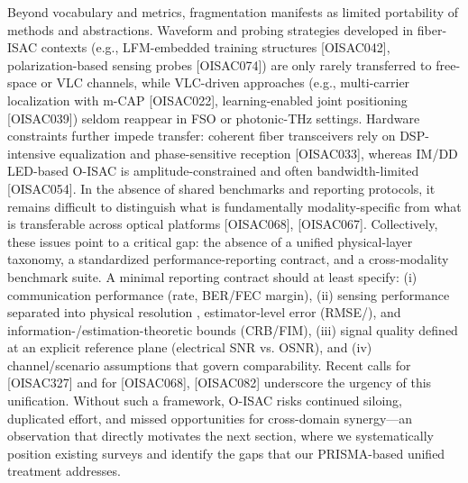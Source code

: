 {} Beyond vocabulary and metrics, fragmentation manifests as limited portability of methods and abstractions. Waveform and probing strategies developed in fiber-ISAC contexts (e.g., LFM-embedded training structures [O\markdownRendererUnderscore{}ISAC\markdownRendererUnderscore{}042], polarization-based sensing probes [O\markdownRendererUnderscore{}ISAC\markdownRendererUnderscore{}074]) are only rarely transferred to free-space or VLC channels, while VLC-driven approaches (e.g., multi-carrier localization with m-CAP [O\markdownRendererUnderscore{}ISAC\markdownRendererUnderscore{}022], learning-enabled joint positioning [O\markdownRendererUnderscore{}ISAC\markdownRendererUnderscore{}039]) seldom reappear in FSO or photonic-THz settings. Hardware constraints further impede transfer: coherent fiber transceivers rely on DSP-intensive equalization and phase-sensitive reception [O\markdownRendererUnderscore{}ISAC\markdownRendererUnderscore{}033], whereas IM/DD LED-based O-ISAC is amplitude-constrained and often bandwidth-limited [O\markdownRendererUnderscore{}ISAC\markdownRendererUnderscore{}054]. In the absence of shared benchmarks and reporting protocols, it remains difficult to distinguish what is fundamentally modality-specific from what is transferable across optical platforms [O\markdownRendererUnderscore{}ISAC\markdownRendererUnderscore{}068], [O\markdownRendererUnderscore{}ISAC\markdownRendererUnderscore{}067].\markdownRendererParagraphSeparator
{} Collectively, these issues point to a critical gap: the absence of a unified physical-layer taxonomy, a standardized performance-reporting contract, and a cross-modality benchmark suite. A minimal reporting contract should at least specify: (i) communication performance (rate, BER/FEC margin), (ii) sensing performance separated into physical resolution , estimator-level error (RMSE/), and information-/estimation-theoretic bounds (CRB/FIM), (iii) signal quality defined at an explicit reference plane (electrical SNR vs. OSNR), and (iv) channel/scenario assumptions that govern comparability. Recent calls for  [O\markdownRendererUnderscore{}ISAC\markdownRendererUnderscore{}327] and for  [O\markdownRendererUnderscore{}ISAC\markdownRendererUnderscore{}068], [O\markdownRendererUnderscore{}ISAC\markdownRendererUnderscore{}082] underscore the urgency of this unification. Without such a framework, O-ISAC risks continued siloing, duplicated effort, and missed opportunities for cross-domain synergy—an observation that directly motivates the next section, where we systematically position existing surveys and identify the gaps that our PRISMA-based unified treatment addresses.\markdownRendererInterblockSeparator
